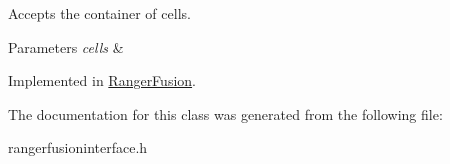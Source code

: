Accepts the container of cells. 


\begin{DoxyParams}{Parameters}
{\em cells} & \\
\hline
\end{DoxyParams}


Implemented in \hyperlink{classRangerFusion_ae3128f8cc8f4cb955d8db661aefba3dc}{Ranger\+Fusion}.



The documentation for this class was generated from the following file\+:\begin{DoxyCompactItemize}
\item 
rangerfusioninterface.\+h\end{DoxyCompactItemize}
